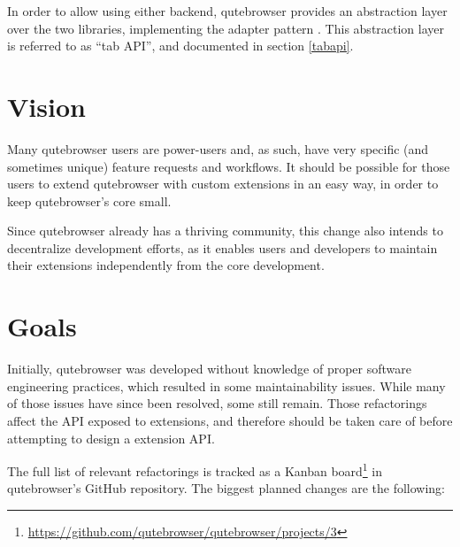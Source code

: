 \documentclass[a4paper,parskip=full,DIV=14,BCOR=15mm]{scrreprt}
\begin{document}
In order to allow using either backend, qutebrowser provides an abstraction
layer over the two libraries, implementing the adapter pattern
\autocite[139ff]{gof}. This abstraction layer is referred to as ``tab API'', and
documented in section \ref{tabapi}.

\section{Vision}
\label{vision}

Many qutebrowser users are power-users and, as such, have very specific (and
sometimes unique) feature requests and workflows. It should be possible for
those users to extend qutebrowser with custom extensions in an easy way, in order
to keep qutebrowser's core small.

Since qutebrowser already has a thriving community, this change also intends to
decentralize development efforts, as it enables users and developers to maintain
their extensions independently from the core development.

\section{Goals}
\label{goals}

Initially, qutebrowser was developed without knowledge of proper software
engineering practices, which resulted in some maintainability issues. While many
of those issues have since been resolved, some still remain. Those
refactorings affect the API exposed to extensions, and therefore should be taken
care of before attempting to design a extension API.

The full list of relevant refactorings is tracked as a Kanban
board\footnote{\url{https://github.com/qutebrowser/qutebrowser/projects/3}} in
qutebrowser's GitHub repository. The biggest planned changes are the following:
\end{document}
